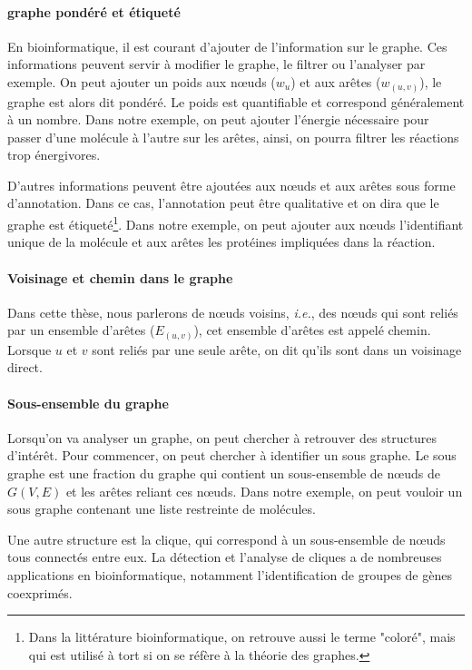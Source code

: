 \paragraph{graphe pondéré et étiqueté}

En bioinformatique, il est courant d'ajouter de l'information sur le graphe. Ces informations peuvent servir à modifier le graphe, le filtrer ou l'analyser par exemple. On peut ajouter un poids aux n\oe uds ($w_u$) et aux arêtes ($w_{(u,v)}$), le graphe est alors dit pondéré. Le poids est quantifiable et correspond généralement à un nombre. Dans notre exemple, on peut ajouter l'énergie nécessaire pour passer d'une molécule à l'autre sur les arêtes, ainsi, on pourra filtrer les réactions trop énergivores. 

D'autres informations peuvent être ajoutées aux n\oe uds et aux arêtes sous forme d'annotation. Dans ce cas, l'annotation peut être qualitative et on dira que le graphe est étiqueté\footnote{Dans la littérature bioinformatique, on retrouve aussi le terme "coloré", mais qui est utilisé à tort si on se réfère à la théorie des graphes.}. Dans notre exemple, on peut ajouter aux n\oe uds l'identifiant unique de la molécule et aux arêtes les protéines impliquées dans la réaction.

\paragraph{Voisinage et chemin dans le graphe}

Dans cette thèse, nous parlerons de n\oe uds voisins, \textit{i.e.}, des n\oe uds qui sont reliés par un ensemble d'arêtes ($E_{(u,v)}$), cet ensemble d'arêtes est appelé chemin. Lorsque $u$ et $v$ sont reliés par une seule arête, on dit qu'ils sont dans un voisinage direct. 

\paragraph{Sous-ensemble du graphe}

Lorsqu'on va analyser un graphe, on peut chercher à retrouver des structures d'intérêt. Pour commencer, on peut chercher à identifier un sous graphe. Le sous graphe est une fraction du graphe qui contient un sous-ensemble de n\oe uds de $G(V, E)$ et les arêtes reliant ces n\oe uds. Dans notre exemple, on peut vouloir un sous graphe contenant une liste restreinte de molécules. 

Une autre structure est la clique, qui correspond à un sous-ensemble de n\oe uds tous connectés entre eux. La détection et l'analyse de cliques a de nombreuses applications en bioinformatique, notamment l'identification de groupes de gènes coexprimés.


